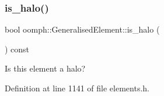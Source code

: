 \mbox{\label{classoomph_1_1GeneralisedElement_a0d9869eaf7d6e104c1e465b0d3cd6a9b}} 
\subsubsection{\texorpdfstring{is\+\_\+halo()}{is\_halo()}}
{\footnotesize\ttfamily bool oomph\+::\+Generalised\+Element\+::is\+\_\+halo (\begin{DoxyParamCaption}{ }\end{DoxyParamCaption}) const\hspace{0.3cm}{\ttfamily [inline]}}



Is this element a halo? 



Definition at line 1141 of file elements.\+h.



